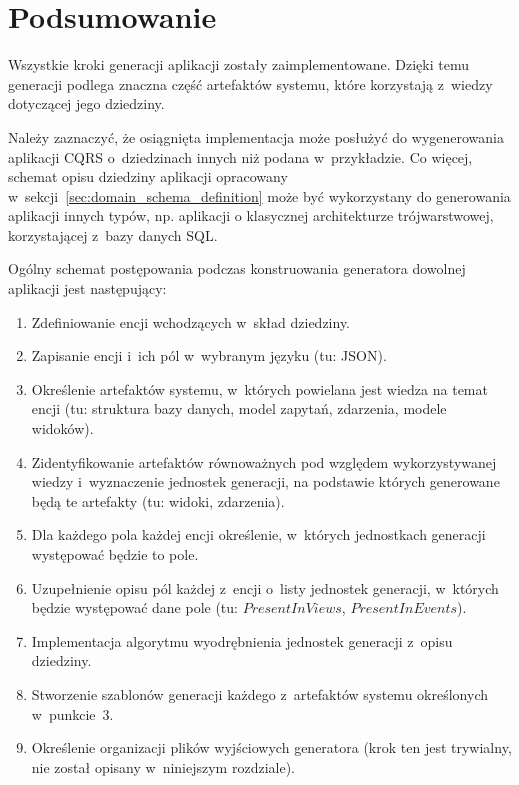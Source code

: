 \section{Podsumowanie}

Wszystkie kroki generacji aplikacji zostały zaimplementowane.
Dzięki temu generacji podlega znaczna część artefaktów systemu, które korzystają z~wiedzy dotyczącej jego dziedziny.

Należy zaznaczyć, że osiągnięta implementacja może posłużyć do wygenerowania aplikacji CQRS o~dziedzinach innych niż podana w~przykładzie.
Co więcej, schemat opisu dziedziny aplikacji opracowany w~sekcji~\ref{sec:domain_schema_definition} może być wykorzystany do generowania aplikacji innych typów, np. aplikacji o klasycznej architekturze trójwarstwowej, korzystającej z~bazy danych SQL.

Ogólny schemat postępowania podczas konstruowania generatora dowolnej aplikacji jest następujący:

\begin{enumerate}
 \item Zdefiniowanie encji wchodzących w~skład dziedziny.
 \item Zapisanie encji i~ich pól w~wybranym języku (tu: JSON).
 \item Określenie artefaktów systemu, w~których powielana jest wiedza na temat encji (tu: struktura bazy danych, model zapytań, zdarzenia, modele widoków).
 \item Zidentyfikowanie artefaktów równoważnych pod względem wykorzystywanej wiedzy i~wyznaczenie jednostek generacji, na podstawie których generowane będą te artefakty (tu: widoki, zdarzenia).
 \item Dla każdego pola każdej encji określenie, w~których jednostkach generacji występować będzie to pole.
 \item Uzupełnienie opisu pól każdej z~encji o~listy jednostek generacji, w~których będzie występować dane pole (tu: $PresentInViews$, $PresentInEvents$).
 \item Implementacja algorytmu wyodrębnienia jednostek generacji z~opisu dziedziny.
 \item Stworzenie szablonów generacji każdego z~artefaktów systemu określonych w~punkcie~3.
 \item Określenie organizacji plików wyjściowych generatora (krok ten jest trywialny, nie został opisany w~niniejszym rozdziale).
\end{enumerate}
